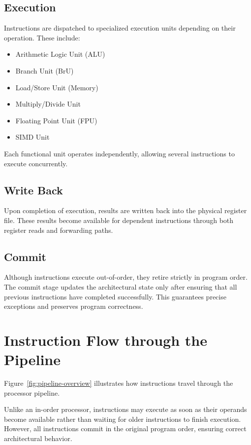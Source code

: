 \subsection*{Execution}
Instructions are dispatched to specialized execution units depending on their operation.
These include:
\begin{itemize}
  \item Arithmetic Logic Unit (ALU)
  \item Branch Unit (BrU)
  \item Load/Store Unit (Memory)
  \item Multiply/Divide Unit
  \item Floating Point Unit (FPU)
  \item SIMD Unit
\end{itemize}
Each functional unit operates independently, allowing several instructions to execute
concurrently.

\subsection*{Write Back}
Upon completion of execution, results are written back into the physical register file. These
results become available for dependent instructions through both register reads and forwarding
paths.

\subsection*{Commit}
Although instructions execute out-of-order, they retire strictly in program order. The commit
stage updates the architectural state only after ensuring that all previous instructions have
completed successfully. This guarantees precise exceptions and preserves program
correctness.

\section{Instruction Flow through the Pipeline}

Figure~\ref{fig:pipeline-overview} illustrates how instructions travel through the processor pipeline.

Unlike an in-order processor, instructions may execute as soon as their operands become
available rather than waiting for older instructions to finish execution. However, all instructions
commit in the original program order, ensuring correct architectural behavior.
